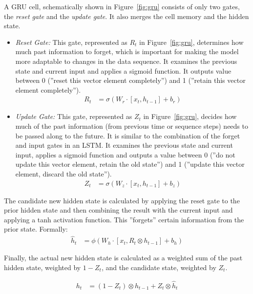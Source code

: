 A GRU cell, schematically shown in Figure~\ref{fig:gru} consists of only two gates, the \emph{reset gate} and the \emph{update gate}. It also merges the cell memory and the hidden state.

\begin{itemize}
\item \emph{Reset Gate:} This gate, represented as $R_t$ in Figure~\ref{fig:gru}, determines how much past information to forget, which is important for making the model more adaptable to changes in the data sequence. It examines the previous state and current input and applies a sigmoid function. It outputs  value between 0 (''reset this vector element completely'') and 1 (''retain this vector element completely'').
\begin{align}
R_t &= \sigma (W_r \cdot [x_t, h_{t-1}] + b_r) \label{eq:reset}
\end{align}
\item \emph{Update Gate:} This gate, represented as $Z_t$ in Figure~\ref{fig:gru}, decides how much of the past information (from previous time or sequence steps) needs to be passed along to the future. It is similar to the combination of the forget and input gates in an LSTM. It examines the previous state and current input, applies a sigmoid function and outputs a value between 0 (''do not update this vector element, retain the old state'') and 1 (''update this vector element, discard the old state''). 
\begin{align}
Z_t &= \sigma (W_z \cdot [x_t, h_{t-1}] + b_z) \label{eq:update}
\end{align}
\end{itemize}

The candidate new hidden state is calculated by applying the reset gate to the prior hidden state and then combining the result with the current input and applying a tanh activation function. This ''forgets'' certain information from the prior state. Formally:
\begin{align}
\hat{h}_t &= \phi (W_h \cdot [x_t, R_t \otimes h_{t-1}] + b_h) \label{eq:candidategru}
\end{align}

Finally, the actual new hidden state is calculated as a weighted sum of the past hidden state, weighted by $1-Z_t$, and the candidate state, weighted by $Z_t$.

\begin{align}
h_t &= (1 - Z_t) \otimes h_{t-1} + Z_t \otimes \hat{h}_t \label{eq:gruoutput}
\end{align}

